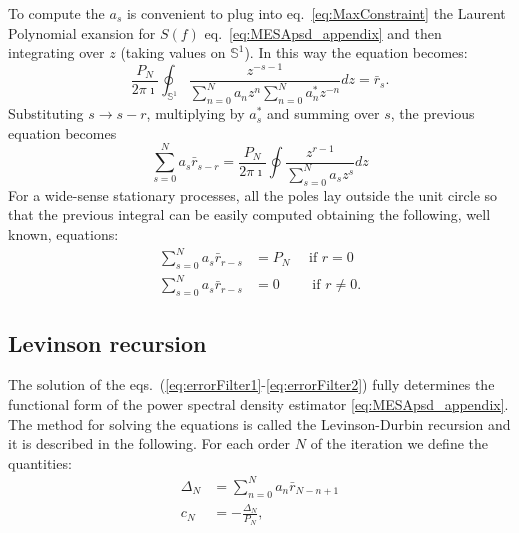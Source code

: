 \documentclass[twocolumn,showpacs,preprintnumbers,nofootinbib,prd,
superscriptaddress,10pt]{revtex4-1}
\begin{document}
To compute the $a_s$ is convenient to plug into eq.~\eqref{eq:MaxConstraint} the Laurent Polynomial exansion for $S(f)$ eq.~\eqref{eq:MESApsd_appendix} and then integrating over $z$ (taking values on ${\mathbb S^1}$). In this way the equation becomes:
\begin{equation}
    \label{eq:contourintegral}
   \frac{P_N}{2 \pi \imath} \oint _{\mathbb S^1}\frac{z^{-s - 1}}{\sum_{n = 0}^N a_n z^n \sum_{n = 0}^N a^*_n z^{-n}}dz = \bar r_s. 
\end{equation}
Substituting $s \to s - r$, multiplying by $a^*_s$ and summing over $s$, the previous equation becomes 
\begin{equation}
    \label{eq:errorFilter}
    \sum_{s = 0}^N a_s \bar r_{s - r} = \frac{P_N}{2 \pi \imath}\oint \frac{z^{r -1}}{\sum_{s = 0}^N a_s z^s}dz
\end{equation}
For a wide-sense stationary processes, all the poles lay outside the unit circle so that the previous integral can be easily computed obtaining the following, well known, equations: 
\begin{align}
    \label{eq:errorFilter1}
    \sum_{s = 0}^N a_s \bar r_{r - s} &= P_N \quad \text{ if } r = 0 \\ \label{eq:errorFilter2}
    \sum_{s = 0}^N a_s \bar r_{r - s} & = 0 \qquad \text{ if } r \neq 0.
\end{align}

\subsection{Levinson recursion} \label{sec:LevinsonRecursion}
The solution of the eqs.~(\ref{eq:errorFilter1}-\ref{eq:errorFilter2}) fully determines the functional form of the power spectral density estimator \eqref{eq:MESApsd_appendix}.
The method for solving the equations is called the Levinson-Durbin recursion \cite{doi:10.1002/sapm1946251261} and it is described in the following.
For each order $N$ of the iteration we define the quantities:
\begin{align}
\Delta_N &= \sum_{n = 0}^{N} a_n \bar{r}_{N - n + 1} \\ 
c_N &= - \frac{\Delta_N}{P_N},
\end{align}
\end{document}

